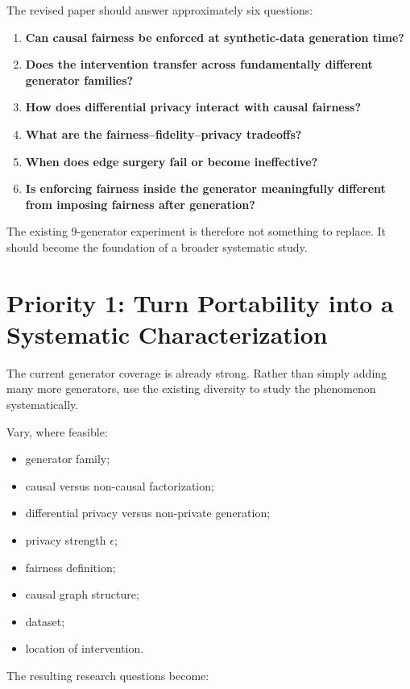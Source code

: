 \documentclass[11pt]{article}
\begin{document}
The revised paper should answer approximately six questions:

\begin{enumerate}
    \item \textbf{Can causal fairness be enforced at synthetic-data generation time?}
    \item \textbf{Does the intervention transfer across fundamentally different generator families?}
    \item \textbf{How does differential privacy interact with causal fairness?}
    \item \textbf{What are the fairness--fidelity--privacy tradeoffs?}
    \item \textbf{When does edge surgery fail or become ineffective?}
    \item \textbf{Is enforcing fairness inside the generator meaningfully different from imposing fairness after generation?}
\end{enumerate}

The existing 9-generator experiment is therefore not something to replace. It should become the foundation of a broader systematic study.

\section*{Priority 1: Turn Portability into a Systematic Characterization}

The current generator coverage is already strong. Rather than simply adding many more generators, use the existing diversity to study the phenomenon systematically.

Vary, where feasible:

\begin{itemize}
    \item generator family;
    \item causal versus non-causal factorization;
    \item differential privacy versus non-private generation;
    \item privacy strength $\epsilon$;
    \item fairness definition;
    \item causal graph structure;
    \item dataset;
    \item location of intervention.
\end{itemize}

The resulting research questions become:
\end{document}

